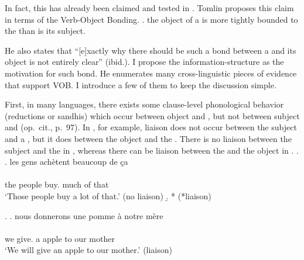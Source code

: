 In fact, this has already been claimed and tested in .
Tomlin proposes this claim in terms of the Verb-Object Bonding.
%
\ex. 
	the object of a  is more tightly bounded to the 
	than is its subject.
	\hfill{\cite[][74]{tomlin86}}

He also states that
``[e]xactly why there should be such a bond between a  and its object is not entirely clear'' (ibid.).
I propose the information-structure 
as the motivation for such bond.
He enumerates many cross-linguistic pieces of evidence that support VOB.
I introduce a few of them to keep the discussion simple.

First,
in many languages,
there exists some clause-level phonological behavior
(reductions or sandhis) which occur between object and ,
but not between subject and  (op.~cit., p.~97).
In , for example,
liaison does not occur between the subject and a ,
but it does between the object and the  \cite[see also][]{selkirk72}.
There is no liaison between the subject  and the   in \Next,
whereas there can be liaison between the   and the object  in \NNext.%
%
\ex.
 \a. \glll
	les gens ach\`{e}tent beaucoup de \c{c}a \\
	      \\
	the people buy. much of that \\
	`Those people buy a lot of that.' \hfill{(no liaison)}
 \b. *      
 		 \hfill{(*liaison)}

\ex.
 \a. \glll
	nous donnerons une pomme \`a notre m\`ere \\
  	       \\
	we give. a apple to our mother \\
	`We will give an apple to our mother.'
	\hfill{(liaison)}
\begin{flushright}
\cite[][pp.~98-99, transcription modified based on standard ]{tomlin86}
\end{flushright}

